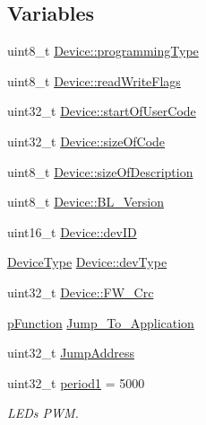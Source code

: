 \subsection*{\-Variables}
\begin{DoxyCompactItemize}
\item 
uint8\-\_\-t \hyperlink{group___copter_control_b_l_ga233c334d07cb137f8460511393f09b1f}{\-Device\-::programming\-Type}
\item 
uint8\-\_\-t \hyperlink{group___copter_control_b_l_ga9c191d83ffbfc96da5ddb6bfed066afb}{\-Device\-::read\-Write\-Flags}
\item 
uint32\-\_\-t \hyperlink{group___copter_control_b_l_ga34965e275b7c25a39a849f168098b130}{\-Device\-::start\-Of\-User\-Code}
\item 
uint32\-\_\-t \hyperlink{group___copter_control_b_l_ga83624b47fe4a34ab22c97ef29934bc80}{\-Device\-::size\-Of\-Code}
\item 
uint8\-\_\-t \hyperlink{group___copter_control_b_l_gaac3d654cfb50d91e3d886848c630d481}{\-Device\-::size\-Of\-Description}
\item 
uint8\-\_\-t \hyperlink{group___copter_control_b_l_gae487fa50d1de851605401068ef8730fb}{\-Device\-::\-B\-L\-\_\-\-Version}
\item 
uint16\-\_\-t \hyperlink{group___copter_control_b_l_gac279d7f2e95b5ea61c2838cace97e0f3}{\-Device\-::dev\-I\-D}
\item 
\hyperlink{group___copter_control_b_l_gad258d4c51629346fceac4679b3209ad9}{\-Device\-Type} \hyperlink{group___copter_control_b_l_ga94b1db8f05f4e21fc5f00333a46c2352}{\-Device\-::dev\-Type}
\item 
uint32\-\_\-t \hyperlink{group___copter_control_b_l_ga676a5d429497021b5ad095b527f935cc}{\-Device\-::\-F\-W\-\_\-\-Crc}
\item 
\hyperlink{group___sparky_b_l_ga9227bf1f1a9c633a0cc9ca50cc761c1a}{p\-Function} \hyperlink{group___copter_control_b_l_gafe6990204003a7b416139a4723064b14}{\-Jump\-\_\-\-To\-\_\-\-Application}
\item 
uint32\-\_\-t \hyperlink{group___copter_control_b_l_ga77170d6dd28c130d54753378bdfa035e}{\-Jump\-Address}
\item 
uint32\-\_\-t \hyperlink{group___copter_control_b_l_gabe751b3d399e053031c1e3db20b6b071}{period1} = 5000
\begin{DoxyCompactList}\small\item\em \-L\-E\-Ds \-P\-W\-M. \end{DoxyCompactList}\item 

\end{DoxyCompactItemize}
